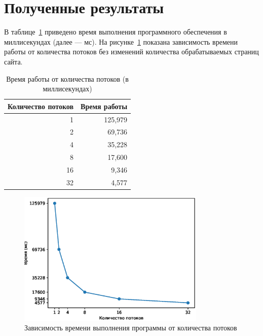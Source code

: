 \section{Полученные результаты}

В таблице~\ref{tbl:time_measurements1} приведено время выполнения
программного обеспечения в миллисекундах (далее --- мс). На рисунке~\ref{fig:image1} показана зависимость времени работы от количества
потоков без изменений количества обрабатываемых страниц сайта.

\begin{table}[h]
	\begin{center}
		\begin{threeparttable}
		\captionsetup{justification=raggedright,singlelinecheck=off}
		\caption{Время работы от количества потоков (в миллисекундах)}
		\label{tbl:time_measurements1}
                    \begin{tabular}{|r|r|}
                        \hline
                        Количество потоков & Время работы\\
                        \hline
                        1 & 125,979 \\
                         \hline
                        2 & 69,736 \\
                         \hline
                        4 & 35,228 \\
                         \hline
                        8 & 17,600 \\
                         \hline
                        16 & 9,346 \\
                         \hline
                        32 & 4,577 \\
                         \hline
                    \end{tabular}
		\end{threeparttable}
    \end{center}
\end{table}

\begin{figure}[h!]
    \centering
    \includegraphics[width=0.8\textwidth]{img/Figure_1.eps}
    \caption{Зависимость времени выполнения программы от количества потоков}
    \label{fig:image1}
\end{figure}

